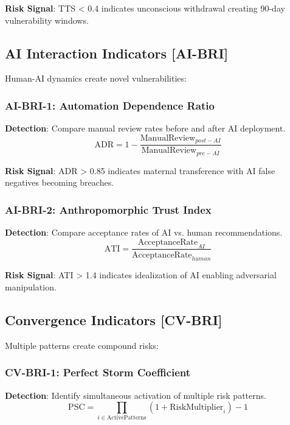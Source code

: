 \documentclass[11pt,a4paper]{article}
\begin{document}
\textbf{Risk Signal}: TTS < 0.4 indicates unconscious withdrawal creating 90-day vulnerability windows.

\subsection{AI Interaction Indicators [AI-BRI]}

Human-AI dynamics create novel vulnerabilities:

\subsubsection{AI-BRI-1: Automation Dependence Ratio}
\textbf{Detection}: Compare manual review rates before and after AI deployment.
\begin{equation}
\text{ADR} = 1 - \frac{\text{ManualReview}_{post-AI}}{\text{ManualReview}_{pre-AI}}
\end{equation}

\textbf{Risk Signal}: ADR > 0.85 indicates maternal transference with AI false negatives becoming breaches.

\subsubsection{AI-BRI-2: Anthropomorphic Trust Index}
\textbf{Detection}: Compare acceptance rates of AI vs. human recommendations.
\begin{equation}
\text{ATI} = \frac{\text{AcceptanceRate}_{AI}}{\text{AcceptanceRate}_{human}}
\end{equation}

\textbf{Risk Signal}: ATI > 1.4 indicates idealization of AI enabling adversarial manipulation.

\subsection{Convergence Indicators [CV-BRI]}

Multiple patterns create compound risks:

\subsubsection{CV-BRI-1: Perfect Storm Coefficient}
\textbf{Detection}: Identify simultaneous activation of multiple risk patterns.
\begin{equation}
\text{PSC} = \prod_{i \in \text{ActivePatterns}} (1 + \text{RiskMultiplier}_i) - 1
\end{equation}
\end{document}
